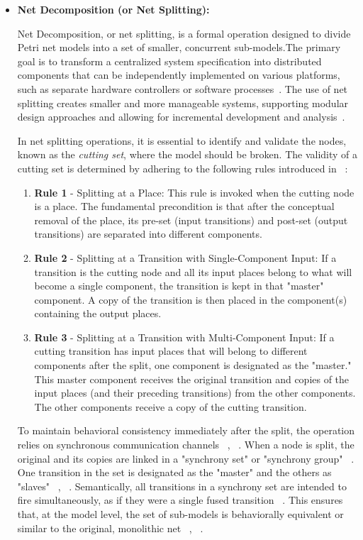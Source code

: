 \begin{itemize}
    \item \textbf{Net Decomposition (or Net Splitting): }     
    
Net Decomposition, or net splitting,  is a formal operation designed to divide Petri net models into a set of smaller, concurrent sub-models.The primary goal is to transform a centralized system specification into distributed components that can be independently implemented on various platforms, such as separate hardware controllers or software processes~\cite{co-design}. The use of net splitting creates smaller and more manageable systems, supporting modular design approaches and allowing for incremental development and analysis~\cite{Barrosadd}.

In net splitting operations, it is essential to identify and validate the nodes, known as the \emph{cutting set}, where the model should be broken. The validity of a cutting set is determined by adhering to the following rules introduced in ~\cite{splitting}:

\begin{enumerate}
    \item \textbf{Rule 1} - Splitting at a Place: This rule is invoked when the cutting node is a place. The fundamental precondition is that after the conceptual removal of the place, its pre-set (input transitions) and post-set (output transitions) are separated into different components.
    \item \textbf{Rule 2} - Splitting at a Transition with Single-Component Input: If a transition is the cutting node and all its input places belong to what will become a single component, the transition is kept in that "master" component. A copy of the transition is then placed in the component(s) containing the output places.
    \item\textbf{ Rule 3} - Splitting at a Transition with Multi-Component Input: If a cutting transition has input places that will belong to different components after the split, one component is designated as the "master." This master component receives the original transition and copies of the input places (and their preceding transitions) from the other components. The other components receive a copy of the cutting transition.
\end{enumerate}

To maintain behavioral consistency immediately after the split, the operation relies on synchronous communication channels ~\cite{splitting}, ~\cite{co-design}. When a node is split, the original and its copies are linked in a "synchrony set" or "synchrony group" ~\cite{co-design}. One transition in the set is designated as the "master" and the others as "slaves" ~\cite{splitting}, ~\cite{co-design}. Semantically, all transitions in a synchrony set are intended to fire simultaneously, as if they were a single fused transition ~\cite{splitting}. This ensures that, at the model level, the set of sub-models is behaviorally equivalent or similar to the original, monolithic net ~\cite{splitting}, ~\cite{co-design}.

\end{itemize}



